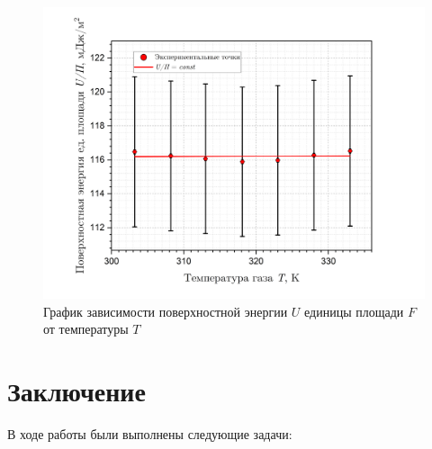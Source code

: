 \documentclass[a4paper, 12pt]{article}
\begin{document}
    \begin{figure}[H]
        \centering
        \includegraphics[width=12cm]{images/graph_const.png}
        \caption{График зависимости поверхностной энергии $U$ единицы площади $F$ от температуры $T$}
        \label{fig:Graph_3}
    \end{figure}

    \section*{Заключение}

    В ходе работы были выполнены следующие задачи:
    
\end{document}
